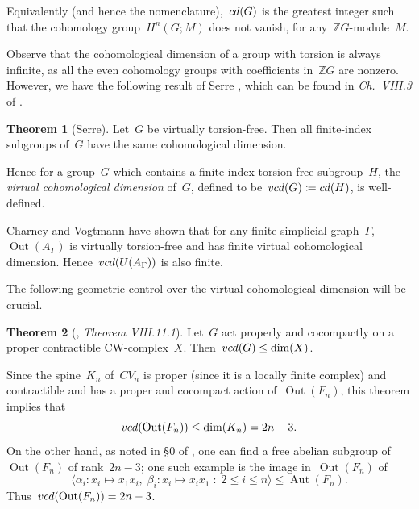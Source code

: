 \documentclass[11pt]{amsart}
\theoremstyle{definition}
\theoremstyle{definition}
\theoremstyle{definition}
\theoremstyle{definition}
\newtheorem{theorem}{Theorem}[section]
\newcommand{\oag}{\operatorname{Out}(A_{\Gamma})} %
\newcommand{\vcduag}{\textsc{vcd}(U(A_{\Gamma}))} %
\begin{document}
Equivalently (and hence the nomenclature),~$\textsc{cd}(G)$ is the greatest integer such that the cohomology group~$H^n(G; M)$ does not vanish, for any~$\mathbb{Z}G$-module~$M$.

Observe that the cohomological dimension of a group with torsion is always infinite, as all the even cohomology groups with coefficients in~$\mathbb{Z}G$ are nonzero. However, we have the following result of Serre \cite{SerreCohomologieGroupesDiscrets71}, which can be found in \textit{Ch.~VIII.3} of \cite{BrownCohomologyofGroups1stEd82}.

\begin{theorem}[Serre]
    Let~$G$ be virtually torsion-free. Then all finite-index subgroups of~$G$ have the same cohomological dimension.
\end{theorem}

Hence for a group~$G$ which contains a finite-index torsion-free subgroup~$H$, the \emph{virtual cohomological dimension} of~$G$, defined to be~$\textsc{vcd}(G) \coloneqq \textsc{cd}(H)$, is well-defined. 

Charney and Vogtmann have shown \cite{CharneyVogtmannFinitenessProperties09} that for any finite simplicial graph~$\Gamma$,~$\oag$ is virtually torsion-free and has finite virtual cohomological dimension. Hence~$\vcduag$ is also finite.

The following geometric control over the virtual cohomological dimension will be crucial.

\begin{theorem}[\cite{BrownCohomologyofGroups1stEd82}, \emph{Theorem VIII.11.1}]\label{thm:vcd upper bound realisation theorem}
    Let~$G$ act properly and cocompactly on a proper contractible CW-complex~$X$. Then~$\textsc{vcd}(G) \leq \dim(X)$.
\end{theorem}

Since the spine~$K_n$ of~$CV_n$ is proper (since it is a locally finite complex) and contractible and has a proper and cocompact action of~$\operatorname{Out}(F_n)$, this theorem implies that
\[\textsc{vcd}(\operatorname{Out}(F_n)) \leq \dim(K_n) = 2n-3.\]
On the other hand, as noted in §0 of \cite{CullerVogtmannOuterSpace86}, one can find a free abelian subgroup of~$\operatorname{Out}(F_n)$ of rank~$2n-3$; one such example is the image in~$\operatorname{Out}(F_n)$ of \[\langle \alpha_i: x_i \mapsto x_1x_i, \; \beta_i: x_i \mapsto x_ix_1 \;:\; 2 \leq i \leq n\rangle \leq \operatorname{Aut}(F_n).\] Thus~$\textsc{vcd}(\operatorname{Out}(F_n)) = 2n-3$.
\end{document}
